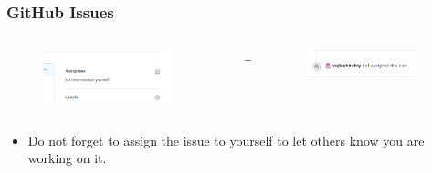 \documentclass[aspectratio=169]{beamer}              %
\begin{document}
\begin{frame}
	\frametitle{GitHub Issues}
	
	\begin{columns}
\begin{column}{0.45\textwidth}
	\begin{figure}[ht!]
	\begin{center}
  	  \includegraphics[width=0.9\textwidth]{img/gh-issue-assign.png}
	\end{center}
	\end{figure}
\end{column}
\begin{column}{0.05\textwidth}
\begin{center}
\large$\rightarrow$
\end{center}
\end{column}
\begin{column}{0.45\textwidth}
\begin{figure}[ht!]
	\begin{center}
  	  \includegraphics[width=0.9\textwidth]{img/gh-issue-assigned.png}
	\end{center}
	\end{figure}
\end{column}
\end{columns}
	
\begin{block}{}
		\begin{itemize}
			\item Do not forget to assign the issue to yourself to let others know you are working on it.
		\end{itemize}
	\end{block}

\end{frame}
\end{document}
